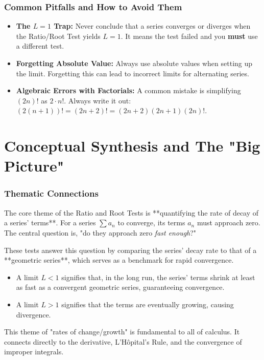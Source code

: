 \documentclass{article}
\begin{document}
\section{Common Pitfalls and How to Avoid Them}
\begin{itemize}
    \item \textbf{The $L=1$ Trap:} Never conclude that a series converges or diverges when the Ratio/Root Test yields $L=1$. It means the test failed and you \textbf{must} use a different test.
    \item \textbf{Forgetting Absolute Value:} Always use absolute values when setting up the limit. Forgetting this can lead to incorrect limits for alternating series.
    \item \textbf{Algebraic Errors with Factorials:} A common mistake is simplifying $(2n)!$ as $2 \cdot n!$. Always write it out: $(2(n+1))! = (2n+2)! = (2n+2)(2n+1)(2n)!$.
\end{itemize}

\part{Conceptual Synthesis and The "Big Picture"}
\section{Thematic Connections}
The core theme of the Ratio and Root Tests is **quantifying the rate of decay of a series' terms**. For a series $\sum a_n$ to converge, its terms $a_n$ must approach zero. The central question is, "do they approach zero \textit{fast enough}?"

These tests answer this question by comparing the series' decay rate to that of a **geometric series**, which serves as a benchmark for rapid convergence.
\begin{itemize}
    \item A limit $L < 1$ signifies that, in the long run, the series' terms shrink at least as fast as a convergent geometric series, guaranteeing convergence.
    \item A limit $L > 1$ signifies that the terms are eventually growing, causing divergence.
\end{itemize}
This theme of "rates of change/growth" is fundamental to all of calculus. It connects directly to the derivative, L'Hôpital's Rule, and the convergence of improper integrals.
\end{document}
